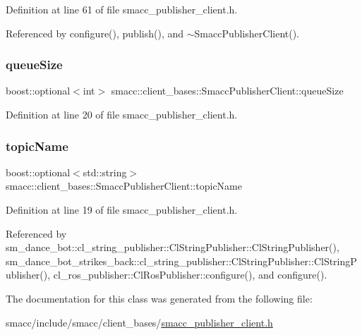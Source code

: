 Definition at line 61 of file smacc\+\_\+publisher\+\_\+client.\+h.



Referenced by configure(), publish(), and $\sim$\+Smacc\+Publisher\+Client().

\mbox{\label{classsmacc_1_1client__bases_1_1SmaccPublisherClient_a1a9b98681b01953f134191799a029fd3}} 
\subsubsection{\texorpdfstring{queue\+Size}{queueSize}}
{\footnotesize\ttfamily boost\+::optional$<$int$>$ smacc\+::client\+\_\+bases\+::\+Smacc\+Publisher\+Client\+::queue\+Size}



Definition at line 20 of file smacc\+\_\+publisher\+\_\+client.\+h.

\mbox{\label{classsmacc_1_1client__bases_1_1SmaccPublisherClient_a8b8d98aef9b3b3a441005d2cb17b4fcc}} 
\subsubsection{\texorpdfstring{topic\+Name}{topicName}}
{\footnotesize\ttfamily boost\+::optional$<$std\+::string$>$ smacc\+::client\+\_\+bases\+::\+Smacc\+Publisher\+Client\+::topic\+Name}



Definition at line 19 of file smacc\+\_\+publisher\+\_\+client.\+h.



Referenced by sm\+\_\+dance\+\_\+bot\+::cl\+\_\+string\+\_\+publisher\+::\+Cl\+String\+Publisher\+::\+Cl\+String\+Publisher(), sm\+\_\+dance\+\_\+bot\+\_\+strikes\+\_\+back\+::cl\+\_\+string\+\_\+publisher\+::\+Cl\+String\+Publisher\+::\+Cl\+String\+Publisher(), cl\+\_\+ros\+\_\+publisher\+::\+Cl\+Ros\+Publisher\+::configure(), and configure().



The documentation for this class was generated from the following file\+:\begin{DoxyCompactItemize}
\item 
smacc/include/smacc/client\+\_\+bases/\hyperlink{smacc__publisher__client_8h}{smacc\+\_\+publisher\+\_\+client.\+h}\end{DoxyCompactItemize}
